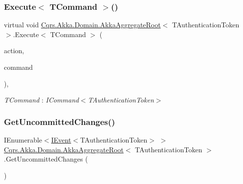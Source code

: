 \mbox{\label{classCqrs_1_1Akka_1_1Domain_1_1AkkaAggregateRoot_af8a9bd0e80498b3b54beb7cbec820533}} 
\subsubsection{\texorpdfstring{Execute$<$ T\+Command $>$()}{Execute< TCommand >()}}
{\footnotesize\ttfamily virtual void \hyperlink{classCqrs_1_1Akka_1_1Domain_1_1AkkaAggregateRoot}{Cqrs.\+Akka.\+Domain.\+Akka\+Aggregate\+Root}$<$ T\+Authentication\+Token $>$.Execute$<$ T\+Command $>$ (\begin{DoxyParamCaption}\item[{Action$<$ T\+Command $>$}]{action,  }\item[{T\+Command}]{command }\end{DoxyParamCaption})\hspace{0.3cm}{\ttfamily [protected]}, {\ttfamily [virtual]}}

\begin{Desc}
\item[Type Constraints]\begin{description}
\item[{\em T\+Command} : {\em I\+Command$<$T\+Authentication\+Token$>$}]\end{description}
\end{Desc}
\mbox{\label{classCqrs_1_1Akka_1_1Domain_1_1AkkaAggregateRoot_a2d11510fec0129ba318f63f7103aeec0}} 
\subsubsection{\texorpdfstring{Get\+Uncommitted\+Changes()}{GetUncommittedChanges()}}
{\footnotesize\ttfamily I\+Enumerable$<$\hyperlink{interfaceCqrs_1_1Events_1_1IEvent}{I\+Event}$<$T\+Authentication\+Token$>$ $>$ \hyperlink{classCqrs_1_1Akka_1_1Domain_1_1AkkaAggregateRoot}{Cqrs.\+Akka.\+Domain.\+Akka\+Aggregate\+Root}$<$ T\+Authentication\+Token $>$.Get\+Uncommitted\+Changes (\begin{DoxyParamCaption}{ }\end{DoxyParamCaption})}



